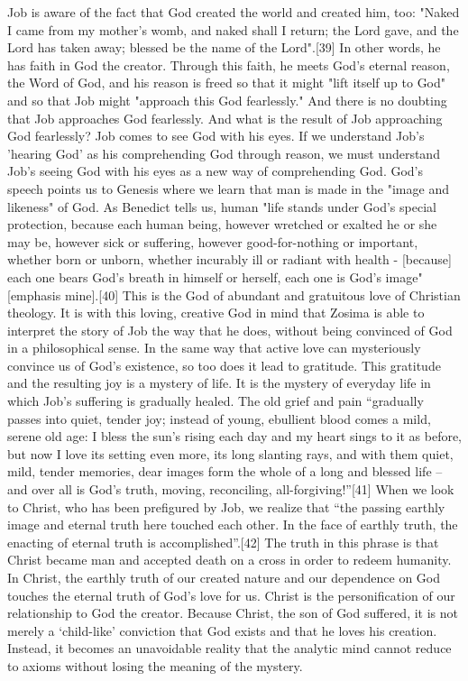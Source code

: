 Job is aware of the fact that God created the world and created him, too: "Naked I came from my mother’s womb, and naked shall I return; the Lord gave, and the Lord has taken away; blessed be the name of the Lord".[39] In other words, he has faith in God the creator. Through this faith, he meets God's eternal reason, the Word of God, and his reason is freed so that it might "lift itself up to God" and so that Job might "approach this God fearlessly." And there is no doubting that Job approaches God fearlessly.
And what is the result of Job approaching God fearlessly? Job comes to see God with his eyes. If we understand Job's 'hearing God' as his comprehending God through reason, we must understand Job's seeing God with his eyes as a new way of comprehending God. God's speech points us to Genesis where we learn that man is made in the "image and likeness" of God. As Benedict tells us, human "life stands under God's special protection, because each human being, however wretched or exalted he or she may be, however sick or suffering, however good-for-nothing or important, whether born or unborn, whether incurably ill or radiant with health - [because] each one bears God's breath in himself or herself, each one is God's image" [emphasis mine].[40] This is the God of abundant and gratuitous love of Christian theology. 
It is with this loving, creative God in mind that Zosima is able to interpret the story of Job the way that  he does, without being convinced of God in a philosophical sense. In the same way that active love can mysteriously convince us of God’s existence, so too does it lead to gratitude. This gratitude and the resulting joy is a mystery of life.  It is the mystery of everyday life in which Job's suffering is gradually healed. The old grief and pain “gradually passes into quiet, tender joy; instead of young, ebullient blood comes a mild, serene old age: I bless the sun's rising each day and my heart sings to it as before, but now I love its setting even more, its long slanting rays, and with them quiet, mild, tender memories, dear images form the whole of a long and blessed life – and over all is God's truth, moving, reconciling, all-forgiving!”[41] When we look to Christ, who has been prefigured by Job, we realize that “the passing earthly image and eternal truth here touched each other. In the face of earthly truth, the enacting of eternal truth is accomplished”.[42]  The truth in this phrase is that Christ became man and accepted death on a cross in order to redeem humanity.  In Christ, the earthly truth of our created nature and our dependence on God touches the eternal truth of God’s love for us.  Christ is the personification of our relationship to God the creator.  Because Christ, the son of God suffered, it is not merely a ‘child-like’ conviction that God exists and that he loves his creation. Instead, it becomes an unavoidable reality that the analytic mind cannot reduce to axioms without losing the meaning of the mystery. 
